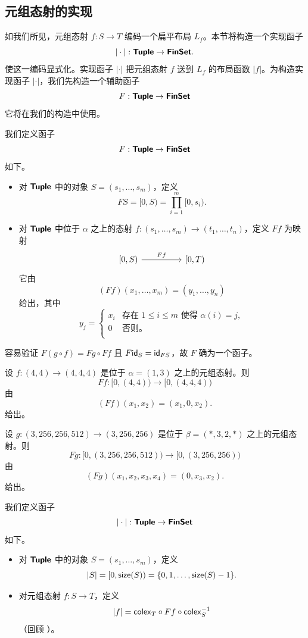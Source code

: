 \subsection{元组态射的实现}
\noindent 如我们所见，元组态射 $f:S \to T$ 编码一个扁平布局 $L_f$。本节将构造一个实现函子
\[
| \cdot |:{\boldsymbol{\mathsf{Tuple}}} \to {\boldsymbol{\mathsf{FinSet}}}.
\]
使这一编码显式化。实现函子 $| \cdot |$ 把元组态射 $f$ 送到 $L_f$ 的布局函数 $|f|$。为构造实现函子 $| \cdot |$，我们先构造一个辅助函子
\[
F:{\boldsymbol{\mathsf{Tuple}}} \to {\boldsymbol{\mathsf{FinSet}}}
\]
它将在我们的构造中使用。
\begin{construction}\label{constructionofrealizationfunctoronC} 我们定义函子
\[F:{\boldsymbol{\mathsf{Tuple}}} \to {\boldsymbol{\mathsf{FinSet}}}\]
如下。
\begin{itemize}
\item 对 ${\boldsymbol{\mathsf{Tuple}}}$ 中的对象 $S = (s_1,\dots,s_m)$，定义
\[
FS = [0,S) = \prod_{i=1}^m  [0,s_i).
\]
\item 对 ${\boldsymbol{\mathsf{Tuple}}}$ 中位于 $\alpha$ 之上的态射 $f:(s_1,\dots,s_m) \to (t_1,\dots,t_n)$，定义 $Ff$ 为映射
\[\begin{tikzcd}
{[}0,S{)} \ar[rr,"Ff"] & & {[}0,T{)}
\end{tikzcd} \]
它由
\[
(Ff)(x_1,\dots,x_m) = (y_1,\dots,y_n)
\]
给出，其中
\[
y_j= \begin{cases}
    x_i & \text{存在 }1 \leq i \leq m\text{ 使得 }\alpha(i) = j,\\
    0 & \text{否则。}\\
\end{cases}
\]
\end{itemize}
\end{construction}

\noindent 容易验证 $F(g \circ f) = Fg \circ Ff$ 且 $F \mathsf{id}_S = \mathsf{id}_{FS}$，故 $F$ 确为一个函子。

\begin{example}
    设 $f:(4,4) \to (4,4,4)$ 是位于 $\alpha = (1,3)$ 之上的元组态射。则
    \[
    Ff : [0,(4,4))
    \to [0,(4,4,4))
    \]
    由
    \[
    (Ff)(x_1,x_2) = (x_1,0,x_2).
    \]
    给出。
\end{example}

\begin{example}
    设 $g:(3,256,256,512) \to (3,256,256)$ 是位于 $\beta = (*,3,2,*)$ 之上的元组态射。则
    \[
    Fg : [0,(3,256,256,512))
    \to [0,(3,256,256))
    \]
    由
    \[
    (Fg)(x_1,x_2,x_3,x_4) = (0,x_3,x_2).
    \]
    给出。
\end{example}

\begin{construction}\label{constructionofrealizationfunctoronC} 我们定义函子
\[|\cdot |:{\boldsymbol{\mathsf{Tuple}}} \to {\boldsymbol{\mathsf{FinSet}}}\]
如下。
\begin{itemize}
\item 对 ${\boldsymbol{\mathsf{Tuple}}}$ 中的对象 $S = (s_1,\dots,s_m)$，定义
\[
|S| = [0,\mathsf{size}(S)) = \{0,1,\dots,\mathsf{size}(S)-1\}.
\]
\item 对元组态射 $f:S \to T$，定义
\[
|f| = \mathsf{colex}_T \circ Ff \circ \mathsf{colex}_S^{-1}
\]
（回顾 ）。
\end{itemize}
\end{construction}

